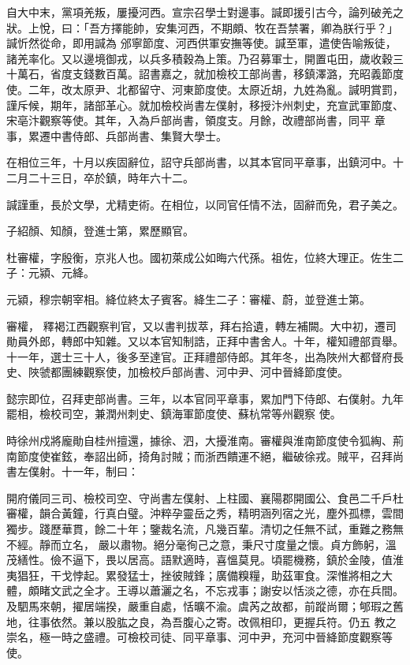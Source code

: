 \begin{pinyinscope}
 自大中末，黨項羌叛，屢擾河西。宣宗召學士對邊事。諴即援引古今，論列破羌之狀。上悅，曰：「吾方擇能帥，安集河西，不期頗、牧在吾禁署，卿為朕行乎？」諴忻然從命，即用諴為
 邠寧節度、河西供軍安撫等使。諴至軍，遣使告喻叛徒，諸羌率化。又以邊境御戎，以兵多積穀為上策。乃召募軍士，開置屯田，歲收穀三十萬石，省度支錢數百萬。詔書嘉之，就加檢校工部尚書，移鎮澤潞，充昭義節度使。二年，改太原尹、北都留守、河東節度使。太原近胡，九姓為亂。諴明賞罰，謹斥候，期年，諸部革心。就加檢校尚書左僕射，移授汴州刺史，充宣武軍節度、宋亳汴觀察等使。其年，入為戶部尚書，領度支。月餘，改禮部尚書，同平
 章事，累遷中書侍郎、兵部尚書、集賢大學士。



 在相位三年，十月以疾固辭位，詔守兵部尚書，以其本官同平章事，出鎮河中。十二月二十三日，卒於鎮，時年六十二。



 諴謹重，長於文學，尤精吏術。在相位，以同官任情不法，固辭而免，君子美之。



 子紹顏、知顏，登進士第，累歷顯官。



 杜審權，字殷衡，京兆人也。國初萊成公如晦六代孫。祖佐，位終大理正。佐生二子：元潁、元絳。



 元潁，穆宗朝宰相。絳位終太子賓客。絳生二子：審權、蔚，並登進士第。



 審權，
 釋褐江西觀察判官，又以書判拔萃，拜右拾遺，轉左補闕。大中初，遷司勛員外郎，轉郎中知雜。又以本官知制誥，正拜中書舍人。十年，權知禮部貢舉。十一年，選士三十人，後多至達官。正拜禮部侍郎。其年冬，出為陜州大都督府長史、陜虢都團練觀察使，加檢校戶部尚書、河中尹、河中晉絳節度使。



 懿宗即位，召拜吏部尚書。三年，以本官同平章事，累加門下侍郎、右僕射。九年罷相，檢校司空，兼潤州刺史、鎮海軍節度使、蘇杭常等州觀察
 使。



 時徐州戍將龐勛自桂州擅還，據徐、泗，大擾淮南。審權與淮南節度使令狐綯、荊南節度使崔鉉，奉詔出師，掎角討賊；而浙西饋運不絕，繼破徐戎。賊平，召拜尚書左僕射。十一年，制曰：



 開府儀同三司、檢校司空、守尚書左僕射、上柱國、襄陽郡開國公、食邑二千戶杜審權，韻合黃鐘，行真白璧。沖粹孕靈岳之秀，精明涵列宿之光，塵外孤標，雲間獨步。踐歷華貫，餘二十年；鑒裁名流，凡幾百輩。清切之任無不試，重難之務無不經。靜而立名，
 嚴以肅物。絕分毫徇己之意，秉尺寸度量之懷。貞方飾躬，溫茂繕性。儉不逼下，畏以居高。語默適時，喜慍莫見。頃罷機務，鎮於金陵，值淮夷猖狂，干戈悖起。累發猛士，挫彼賊鋒；廣備糗糧，助茲軍食。深惟將相之大體，頗睹文武之全才。王導以蕭灑之名，不忘戎事；謝安以恬淡之德，亦在兵間。及駟馬來朝，擢居端揆，嚴重自處，恬曠不渝。虞芮之故都，前蹤尚爾；郇瑕之舊地，往事依然。兼以股肱之良，為吾腹心之寄。改佩相印，更握兵符。仍五
 教之崇名，極一時之盛禮。可檢校司徒、同平章事、河中尹，充河中晉絳節度觀察等使。




\end{pinyinscope}
